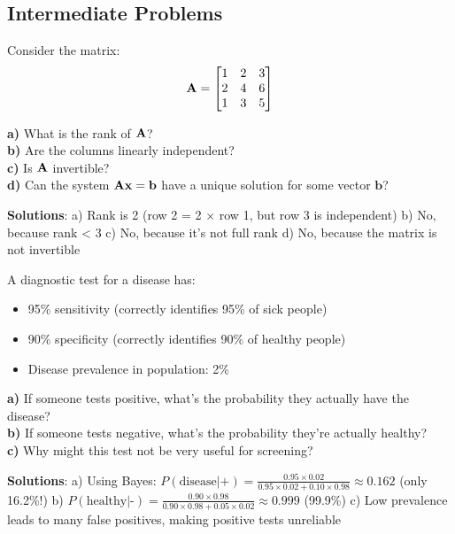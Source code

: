 \documentclass{article}
\newcounter{exercise}
\begin{document}
\subsection{Intermediate Problems}

\begin{tcolorbox}[colback=gray!5!white,colframe=gray!75!black,title=Problem \stepcounter{exercise}\#\theexercise: Rank and Linear Independence]
Consider the matrix:
$$\mathbf{A} = \begin{bmatrix} 
1 & 2 & 3 \\
2 & 4 & 6 \\
1 & 3 & 5
\end{bmatrix}$$

\textbf{a)} What is the rank of $\mathbf{A}$?\\
\textbf{b)} Are the columns linearly independent?\\
\textbf{c)} Is $\mathbf{A}$ invertible?\\
\textbf{d)} Can the system $\mathbf{A}\mathbf{x} = \mathbf{b}$ have a unique solution for some vector $\mathbf{b}$?

\textbf{Solutions}:
a) Rank is 2 (row 2 = 2 × row 1, but row 3 is independent)
b) No, because rank < 3
c) No, because it's not full rank
d) No, because the matrix is not invertible
\end{tcolorbox}

\begin{tcolorbox}[colback=gray!5!white,colframe=gray!75!black,title=Problem \stepcounter{exercise}\#\theexercise: Probability and Bayes]
A diagnostic test for a disease has:
\begin{itemize}
    \item 95\% sensitivity (correctly identifies 95\% of sick people)
    \item 90\% specificity (correctly identifies 90\% of healthy people)
    \item Disease prevalence in population: 2\%
\end{itemize}

\textbf{a)} If someone tests positive, what's the probability they actually have the disease?\\
\textbf{b)} If someone tests negative, what's the probability they're actually healthy?\\
\textbf{c)} Why might this test not be very useful for screening?

\textbf{Solutions}:
a) Using Bayes: $P(\text{disease}|\text{+}) = \frac{0.95 \times 0.02}{0.95 \times 0.02 + 0.10 \times 0.98} \approx 0.162$ (only 16.2\%!)
b) $P(\text{healthy}|\text{-}) = \frac{0.90 \times 0.98}{0.90 \times 0.98 + 0.05 \times 0.02} \approx 0.999$ (99.9\%)
c) Low prevalence leads to many false positives, making positive tests unreliable
\end{tcolorbox}
\end{document}
